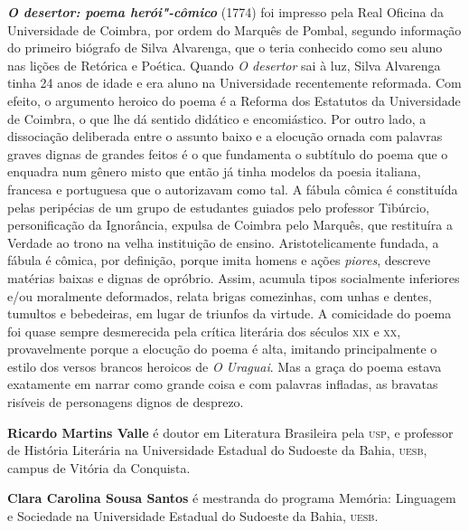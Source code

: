 \textbf{\textit{O desertor: poema herói"-cômico}} (1774) foi impresso pela Real
Oficina da Universidade de Coimbra, por ordem do Marquês de Pombal,
segundo informação do primeiro biógrafo de Silva Alvarenga, que o teria conhecido
como seu aluno nas lições de Retórica e Poética.
Quando \textit{O desertor} sai à luz, Silva Alvarenga tinha 24 anos de
idade e era aluno na Universidade recentemente reformada.
Com efeito, o argumento heroico do poema é a Reforma dos Estatutos da
Universidade de Coimbra, o que lhe dá sentido didático e encomiástico.
Por outro lado, a dissociação deliberada entre o assunto baixo e a elocução
ornada com palavras graves dignas de grandes feitos é o que fundamenta o
subtítulo do poema que o enquadra num gênero misto que então já tinha modelos
da poesia italiana, francesa e portuguesa que o autorizavam como tal.
A fábula cômica é constituída pelas peripécias de um grupo de estudantes
guiados pelo professor Tibúrcio, personificação da Ignorância, expulsa
de Coimbra pelo Marquês, que restituíra a Verdade ao trono na velha
instituição de ensino.
Aristotelicamente fundada, a fábula é cômica, por definição, porque imita
homens e ações \textit{piores}, descreve matérias baixas e dignas de opróbrio.
Assim, acumula tipos socialmente inferiores e/ou moralmente deformados,
relata brigas comezinhas, com unhas e dentes, tumultos e bebedeiras, em lugar
de triunfos da virtude.
A comicidade do poema foi quase sempre desmerecida pela crítica literária
dos séculos \textsc{xix} e \textsc{xx}, provavelmente porque a elocução do poema é alta,
imitando principalmente o estilo dos versos brancos heroicos de \textit{O Uraguai}.
Mas a graça do poema estava exatamente em narrar como grande coisa e com palavras
infladas, as bravatas risíveis de personagens dignos de desprezo.


\textbf{Ricardo Martins Valle} é doutor em Literatura Brasileira pela
\textsc{usp}, e professor de História Literária na Universidade Estadual do
Sudoeste da Bahia, \textsc{uesb}, campus de Vitória da Conquista.

\textbf{Clara Carolina Sousa Santos} é mestranda do programa Memória: Linguagem e Sociedade
na Universidade Estadual do Sudoeste da Bahia, \textsc{uesb}. 


